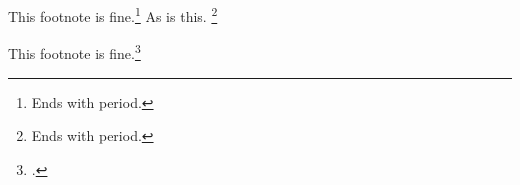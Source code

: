 \documentclass{article}
\begin{document}
This footnote is fine.\footnote{Ends with period.}
As is this.%
	\footnote{Ends with period.}

This footnote is fine.\footcite{s}
\end{document}
